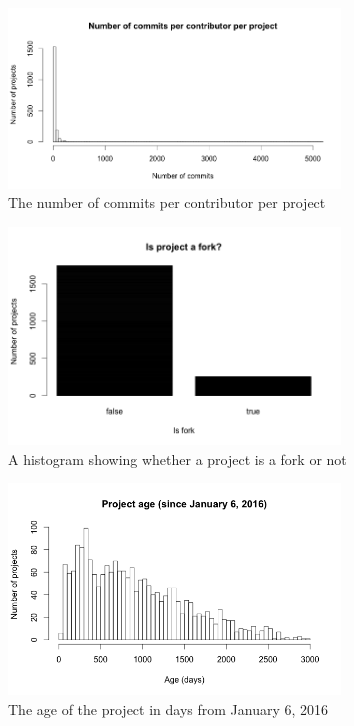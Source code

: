 	    \begin{figure}[h!]
	        \includegraphics[width=250pt]{figures/nr-commits-per-contributor}
	        \caption{The number of commits per contributor per project}
	        \label{fig:nr-commit-contributor-plot}
	    \end{figure}

	    \begin{figure}[h!]
	        \includegraphics[width=250pt]{figures/isfork-per-project}
	        \caption{A histogram showing whether a project is a fork or not}
	        \label{fig:is-fork-plot}
	    \end{figure}

	    \begin{figure}[h!]
	        \includegraphics[width=250pt]{figures/project-age}
	        \caption{The age of the project in days from January 6, 2016}
	        \label{fig:age-plot}
	    \end{figure}

